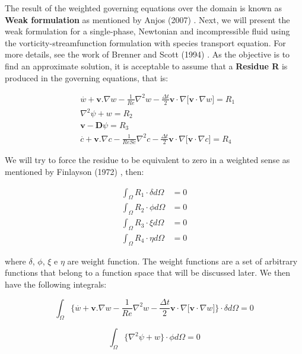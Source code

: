 The result of the weighted governing equations over the domain 
is known as \textbf{Weak formulation} as mentioned by Anjos (2007) 
\cite{anjos2007}. Next, we will present the weak formulation 
for a single-phase, Newtonian and incompressible fluid using 
the vorticity-streamfunction formulation with species transport equation. 
For more details, see the work of Brenner and Scott (1994) 
\cite{brenner1994}. 
As the objective is to find an approximate solution, 
it is acceptable to assume that a \textbf{Residue R} 
is produced in the governing equations, that is:


\begin{align}
& \overset{.}{w} + \textbf{v}.\nabla w - \frac{1}{Re} \nabla^2 w 
 - \frac{\Delta t}{2} \textbf{v} \cdot \nabla \big[ \textbf{v} \cdot \nabla w \big]
 = R_1 \\[10pt]
& \nabla^2 \psi + w
 = R_2 \\[10pt]
& \textbf{v} - \textbf{D}\psi
 = R_3 \\[10pt]
& \overset{.}{c} + \textbf{v}.\nabla c - \frac{1}{ReSc} \nabla^2 c
 - \frac{\Delta t}{2} \textbf{v} \cdot \nabla \big[ \textbf{v} \cdot \nabla c \big]
 = R_4
\end{align}

We will try to force the residue to be equivalent to zero 
in a weighted sense as mentioned by Finlayson (1972) \cite{finlayson1972}, then:

\begin{align}
 \int_{\Omega} R_1 \cdot \delta d\Omega &= 0 \\
 \int_{\Omega} R_2 \cdot \phi d\Omega &= 0 \\
 \int_{\Omega} R_3 \cdot \xi d\Omega &= 0 \\
 \int_{\Omega} R_4 \cdot \eta d\Omega &= 0
\end{align}



\noindent
where $\delta$, $\phi$, $\xi$ e $\eta$ are weight function.
The weight functions are a set of arbitrary functions 
that belong to a function space that will be discussed later. 
We then have the following integrals:

\begin{equation}
 \int_{\Omega} \Bigg\{ 
 \overset{.}{w} + \textbf{v}.\nabla w 
 - \frac{1}{\textit{Re}} \nabla^2 w 
 - \frac{\Delta t}{2} \textbf{v} \cdot \nabla \big[ \textbf{v} \cdot \nabla w \big]
\Bigg\} \cdot \delta d\Omega = 0
\end{equation}

\begin{equation}
 \int_{\Omega} \big\{ \nabla^2 \psi + w \big\} \cdot \phi d\Omega = 0
\end{equation}

